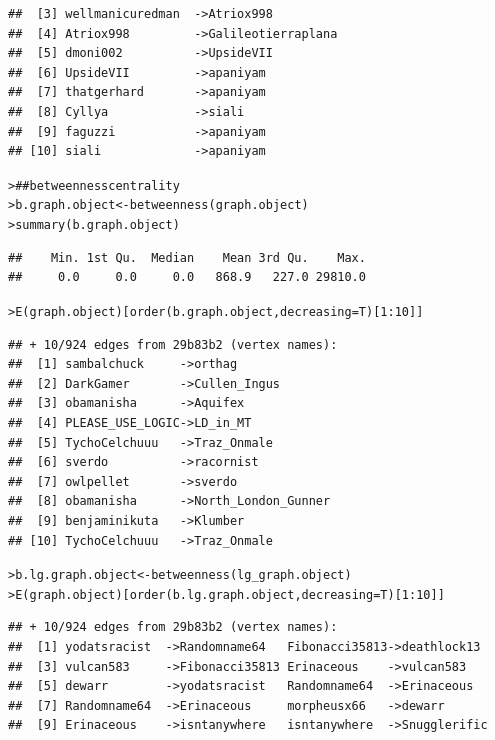 \documentclass[12pt]{article}\usepackage[]{graphicx}\usepackage[]{color}
\makeatletter
\newcommand{\hlnum}[1]{\textcolor[rgb]{0.82,0.78,0.62}{#1}}%
\newcommand{\hlcom}[1]{\textcolor[rgb]{0.404,0.408,0.42}{#1}}%
\newcommand{\hlopt}[1]{\textcolor[rgb]{0.882,0.878,0.898}{#1}}%
\newcommand{\hlstd}[1]{\textcolor[rgb]{0.882,0.878,0.898}{#1}}%
\newcommand{\hlkwb}[1]{\textcolor[rgb]{0.902,0.675,0.196}{#1}}%
\newcommand{\hlkwc}[1]{\textcolor[rgb]{0.812,0.522,0.388}{#1}}%
\newcommand{\hlkwd}[1]{\textcolor[rgb]{0.733,0.388,0.812}{#1}}%
\newenvironment{kframe}{%
 \def\at@end@of@kframe{}%
 \ifinner\ifhmode%
  \def\at@end@of@kframe{\end{minipage}}%
  \begin{minipage}{\columnwidth}%
 \fi\fi%
 \def\FrameCommand##1{\hskip\@totalleftmargin \hskip-\fboxsep
 \colorbox{shadecolor}{##1}\hskip-\fboxsep
     \hskip-\linewidth \hskip-\@totalleftmargin \hskip\columnwidth}%
 \MakeFramed {\advance\hsize-\width
   \@totalleftmargin\z@ \linewidth\hsize
   \@setminipage}}%
 {\par\unskip\endMakeFramed%
 \at@end@of@kframe}
\newenvironment{knitrout}{}{} %
\makeatother
\begin{document}
\begin{flushleft}
\begin{knitrout}
\begin{kframe}
\begin{verbatim}
##  [3] wellmanicuredman  ->Atriox998         
##  [4] Atriox998         ->Galileotierraplana
##  [5] dmoni002          ->UpsideVII         
##  [6] UpsideVII         ->apaniyam          
##  [7] thatgerhard       ->apaniyam          
##  [8] Cyllya            ->siali             
##  [9] faguzzi           ->apaniyam          
## [10] siali             ->apaniyam
\end{verbatim}
\begin{alltt}
\hlstd{> }\hlcom{## betweenness centrality}
\hlstd{> }\hlstd{b.graph.object} \hlkwb{<-} \hlkwd{betweenness}\hlstd{(graph.object)}
\hlstd{> }\hlkwd{summary}\hlstd{(b.graph.object)}
\end{alltt}
\begin{verbatim}
##    Min. 1st Qu.  Median    Mean 3rd Qu.    Max. 
##     0.0     0.0     0.0   868.9   227.0 29810.0
\end{verbatim}
\begin{alltt}
\hlstd{> }\hlkwd{E}\hlstd{(graph.object)[}\hlkwd{order}\hlstd{(b.graph.object,} \hlkwc{decreasing}\hlstd{=T)[}\hlnum{1}\hlopt{:}\hlnum{10}\hlstd{]]}
\end{alltt}
\begin{verbatim}
## + 10/924 edges from 29b83b2 (vertex names):
##  [1] sambalchuck     ->orthag             
##  [2] DarkGamer       ->Cullen_Ingus       
##  [3] obamanisha      ->Aquifex            
##  [4] PLEASE_USE_LOGIC->LD_in_MT           
##  [5] TychoCelchuuu   ->Traz_Onmale        
##  [6] sverdo          ->racornist          
##  [7] owlpellet       ->sverdo             
##  [8] obamanisha      ->North_London_Gunner
##  [9] benjaminikuta   ->Klumber            
## [10] TychoCelchuuu   ->Traz_Onmale
\end{verbatim}
\begin{alltt}
\hlstd{> }\hlstd{b.lg.graph.object} \hlkwb{<-} \hlkwd{betweenness}\hlstd{(lg_graph.object)}
\hlstd{> }\hlkwd{E}\hlstd{(graph.object)[}\hlkwd{order}\hlstd{(b.lg.graph.object,} \hlkwc{decreasing}\hlstd{=T)[}\hlnum{1}\hlopt{:}\hlnum{10}\hlstd{]]}
\end{alltt}
\begin{verbatim}
## + 10/924 edges from 29b83b2 (vertex names):
##  [1] yodatsracist  ->Randomname64   Fibonacci35813->deathlock13   
##  [3] vulcan583     ->Fibonacci35813 Erinaceous    ->vulcan583     
##  [5] dewarr        ->yodatsracist   Randomname64  ->Erinaceous    
##  [7] Randomname64  ->Erinaceous     morpheusx66   ->dewarr        
##  [9] Erinaceous    ->isntanywhere   isntanywhere  ->Snugglerific
\end{verbatim}

\end{kframe}
\end{knitrout}
\end{flushleft}
\end{document}
